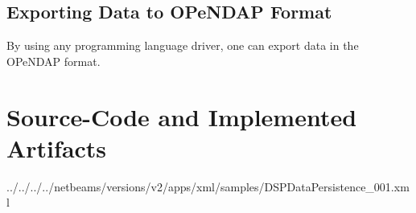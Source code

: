 \subsection{Exporting Data to OPeNDAP Format}

By using any programming language driver, one can export data in the OPeNDAP
format.

\section{Source-Code and Implemented Artifacts}












{../../../../netbeams/versions/v2/apps/xml/samples/DSPDataPersistence_001.xml}






